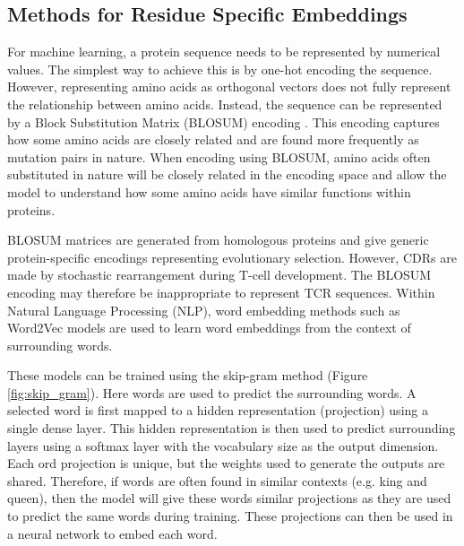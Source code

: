 \subsection{Methods for Residue Specific Embeddings}
For machine learning, a protein sequence needs to be represented by numerical values. The simplest way to achieve this is by one-hot encoding the sequence. However, representing amino acids as orthogonal vectors does not fully represent the relationship between amino acids. Instead, the sequence can be represented by a Block Substitution Matrix (BLOSUM) encoding \cite{Henikoff1992AminoBlocks}. This encoding captures how some amino acids are closely related and are found more frequently as mutation pairs in nature. When encoding using BLOSUM, amino acids often substituted in nature will be closely related in the encoding space and allow the model to understand how some amino acids have similar functions within proteins.

BLOSUM matrices are generated from homologous proteins and give generic protein-specific encodings representing evolutionary selection. However, CDRs are made by stochastic rearrangement during T-cell development. The BLOSUM encoding may therefore be inappropriate to represent TCR sequences. Within Natural Language Processing (NLP), word embedding methods such as Word2Vec models \cite{Mikolov2013EfficientSpace} are used to learn word embeddings from the context of surrounding words.

These models can be trained using the skip-gram method (Figure \ref{fig:skip_gram}). Here words are used to predict the surrounding words. A selected word is first mapped to a hidden representation (projection) using a single dense layer. This hidden representation is then used to predict surrounding layers using a softmax layer with the vocabulary size as the output dimension. Each ord projection is unique, but the weights used to generate the outputs are shared. Therefore, if words are often found in similar contexts (e.g. king and queen), then the model will give these words similar projections as they are used to predict the same words during training. These projections can then be used in a neural network to embed each word.

